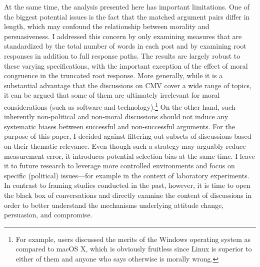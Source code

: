 At the same time, the analysis presented here has important limitations. One of the biggest potential issues is the fact that the matched argument pairs differ in length, which may confound the relationship between morality and persuasiveness. I addressed this concern by only examining measures that are standardized by the total number of words in each post and by examining root responses in addition to full response paths. The results are largely robust to these varying specifications, with the important exception of the effect of moral congruence in the truncated root response. More generally, while it is a substantial advantage that the discussions on CMV cover a wide range of topics, it can be argued that some of them are ultimately irrelevant for moral considerations (such as software and technology).\footnote{For example, users discussed the merits of the Windows operating system as compared to macOS X, which is obviously fruitless since Linux is superior to either of them and anyone who says otherwise is morally wrong.} On the other hand, such inherently non-political and non-moral discussions should not induce any systematic biases between successful and non-successful arguments. For the purpose of this paper, I decided against filtering out subsets of discussions based on their thematic relevance. Even though such a strategy may arguably reduce measurement error, it introduces potential selection bias at the same time. I leave it to future research to leverage more controlled environments and focus on specific (political) issues---for example in the context of laboratory experiments. In contrast to framing studies conducted in the past, however, it is time to open the black box of conversations and directly examine the content of discussions in order to better understand the mechanisms underlying attitude change, persuasion, and compromise.




